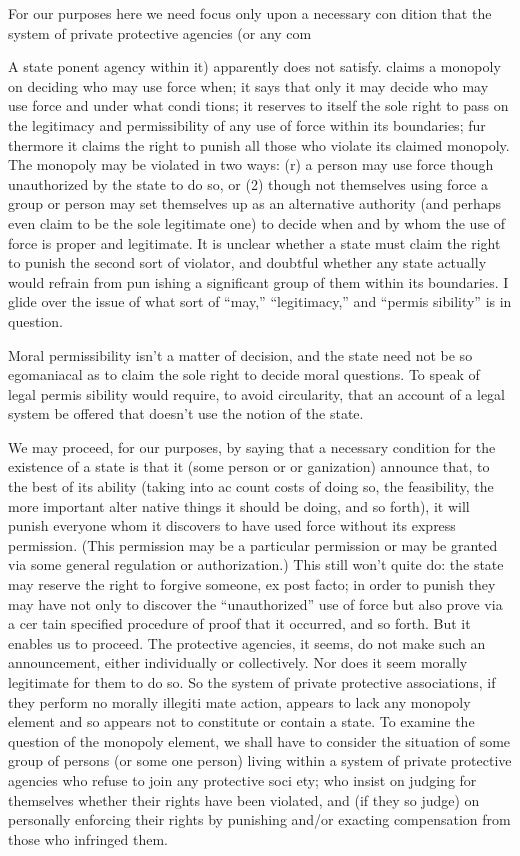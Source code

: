 \documentclass[11pt,openany]{book}
\begin{document}
For our purposes here we need focus only upon a necessary con dition that the system of private protective agencies (or any com

A state ponent agency within it) apparently does not satisfy. claims a monopoly on deciding who may use force when; it says that only it may decide who may use force and under what condi tions; it reserves to itself the sole right to pass on the legitimacy and permissibility of any use of force within its boundaries; fur thermore it claims the right to punish all those who violate its claimed monopoly. The monopoly may be violated in two ways: (r) a person may use force though unauthorized by the state to do so, or (2) though not themselves using force a group or person may set themselves up as an alternative authority (and perhaps even claim to be the sole legitimate one) to decide when and by whom the use of force is proper and legitimate. It is unclear whether a state must claim the right to punish the second sort of violator, and doubtful whether any state actually would refrain from pun ishing a significant group of them within its boundaries. I glide over the issue of what sort of ``may,'' ``legitimacy,'' and ``permis sibility'' is in question. 

Moral permissibility isn't a matter of decision, and the state need not be so egomaniacal as to claim the sole right to decide moral questions. To speak of legal permis sibility would require, to avoid circularity, that an account of a legal system be offered that doesn't use the notion of the state. 

We may proceed, for our purposes, by saying that a necessary condition for the existence of a state is that it (some person or or ganization) announce that, to the best of its ability (taking into ac count costs of doing so, the feasibility, the more important alter native things it should be doing, and so forth), it will punish everyone whom it discovers to have used force without its express permission. (This permission may be a particular permission or may be granted via some general regulation or authorization.) This still won't quite do: the state may reserve the right to forgive someone, ex post facto; in order to punish they may have not only to discover the ``unauthorized'' use of force but also prove via a cer tain specified procedure of proof that it occurred, and so forth. But it enables us to proceed. The protective agencies, it seems, do not make such an announcement, either individually or collectively. Nor does it seem morally legitimate for them to do so. So the system of private protective associations, if they perform no morally illegiti mate action, appears to lack any monopoly element and so appears not to constitute or contain a state. To examine the question of the monopoly element, we shall have to consider the situation of some group of persons (or some one person) living within a system of private protective agencies who refuse to join any protective soci ety; who insist on judging for themselves whether their rights have been violated, and (if they so judge) on personally enforcing their rights by punishing and/or exacting compensation from those who infringed them. 
\end{document}
